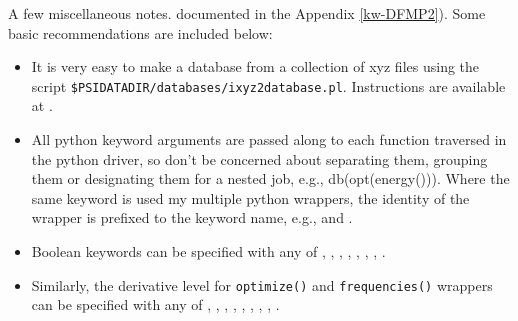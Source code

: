 A few miscellaneous notes.
documented in the Appendix \ref{kw-DFMP2}). Some basic recommendations are included below:
\begin{itemize}
\item It is very easy to make a database from a collection of xyz files using the script
\texttt{\$PSIDATADIR/databases/ixyz2database.pl}. Instructions are available at 
.
\item All python keyword arguments are passed along to each function traversed in the
python driver, so don't be concerned about separating them, grouping them or
designating them for a nested job, e.g., db(opt(energy())). Where the same keyword is
used my multiple python wrappers, the identity of the wrapper is prefixed to the keyword
name, e.g.,  and .
\item Boolean keywords can be specified with any of , 
, , , , 
, ,  .
\item Similarly, the derivative level for \texttt{optimize()} and \texttt{frequencies()} wrappers
can be specified with any of , , ,
, , ,
, , .
\end{itemize}

